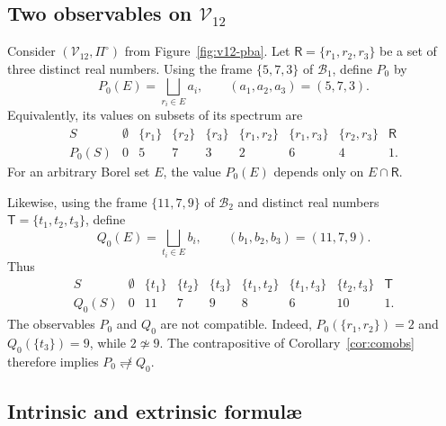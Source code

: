 \documentclass{article}   	%
\theoremstyle{plain}
\theoremstyle{definition}
\theoremstyle{remark}
\begin{document}
\subsection{Two observables on $\mathcal V_{12}$}
\label{subsec:obsv12}

Consider $(\mathcal V_{12},\Pi^\circ)$ from
Figure~\ref{fig:v12-pba}.  Let
$\mathsf R=\{r_1,r_2,r_3\}$ be a set of three distinct real numbers.
Using the frame $\{5,7,3\}$ of $\mathcal B_1$, define $P_0$ by
\begin{equation}
\label{eq:obs1}
P_0(E)=
\bigsqcup_{r_i\in E} a_i,
\qquad (a_1,a_2,a_3)=(5,7,3).
\end{equation}
Equivalently, its values on subsets of its spectrum are
\[
\begin{array}{c|cccccccc}
S
&\emptyset&\{r_1\}&\{r_2\}&\{r_3\}
&\{r_1,r_2\}&\{r_1,r_3\}&\{r_2,r_3\}&\mathsf R\\ \hline
P_0(S)&0&5&7&3&2&6&4&1.
\end{array}
\]
For an arbitrary Borel set $E$, the value $P_0(E)$ depends only on
$E\cap\mathsf R$.

Likewise, using the frame $\{11,7,9\}$ of $\mathcal B_2$ and distinct real
numbers $\mathsf T=\{t_1,t_2,t_3\}$, define
\begin{equation}
\label{eq:obs2}
Q_0(E)=
\bigsqcup_{t_i\in E} b_i,
\qquad (b_1,b_2,b_3)=(11,7,9).
\end{equation}
Thus
\[
\begin{array}{c|cccccccc}
S
&\emptyset&\{t_1\}&\{t_2\}&\{t_3\}
&\{t_1,t_2\}&\{t_1,t_3\}&\{t_2,t_3\}&\mathsf T\\ \hline
Q_0(S)&0&11&7&9&8&6&10&1.
\end{array}
\]
The observables $P_0$ and $Q_0$ are not compatible.  Indeed,
$P_0(\{r_1,r_2\})=2$ and $Q_0(\{t_3\})=9$, while
$2\not\simeq 9$.  The contrapositive of Corollary~\ref{cor:comobs} therefore
implies $P_0\not\rightleftharpoons Q_0$.

\subsection{Intrinsic and extrinsic formul\ae}
\label{subsec:intrinsic}
\end{document}
